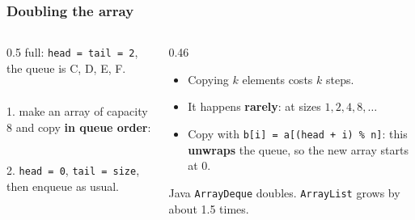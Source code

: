 \documentclass[aspectratio=169,10pt,compress]{beamer}
\begin{document}
\begin{frame}[t,fragile] \frametitle{Doubling the array}
  \begin{columns}[T]
    \begin{column}{0.5\textwidth}
      \small full: \texttt{head = tail = 2}, the queue is C, D, E, F.\\
      \\[0.2em]
      1. make an array of capacity 8 and copy \textbf{in queue order}:\\
      \\[0.2em]
      2. \texttt{head = 0}, \texttt{tail = size}, then enqueue as usual.
    \end{column}
    \begin{column}{0.46\textwidth}
      \begin{itemize}\small
        \item Copying $k$ elements costs $k$ steps.
        \item It happens \textbf{rarely}: at sizes $1, 2, 4, 8, \dots$
        \item Copy with \texttt{b[i] = a[(head + i) \% n]}: this \textbf{unwraps} the queue, so the new array starts at 0.
      \end{itemize}
      \begin{block}{Java}
        \small \texttt{ArrayDeque} doubles. \texttt{ArrayList} grows by about 1.5 times.
      \end{block}
    \end{column}
  \end{columns}
\end{frame}
\end{document}

